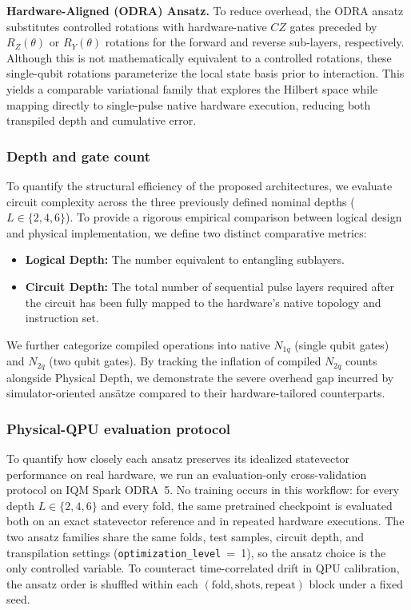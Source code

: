 \documentclass[11pt]{article}
\begin{document}
\textbf{Hardware-Aligned (ODRA) Ansatz.}
To reduce overhead, the ODRA ansatz~\cite{abbas2021} substitutes controlled rotations with hardware-native $CZ$ gates preceded by $R_Z(\theta)$ or $R_Y(\theta)$ rotations for the forward and reverse sub-layers, respectively. Although this is not mathematically equivalent to a controlled rotations, these single-qubit rotations parameterize the local state basis prior to interaction. This yields a comparable variational family that explores the Hilbert space while mapping directly to single-pulse native hardware execution, reducing both transpiled depth and cumulative error.

\subsubsection{Depth and gate count}

To quantify the structural efficiency of the proposed architectures, we evaluate circuit complexity across the three previously defined nominal depths ($L \in \{2, 4, 6\}$). To provide a rigorous empirical comparison between logical design and physical implementation, we define two distinct comparative metrics:
\begin{itemize}
    \item \textbf{Logical Depth:} The number equivalent to entangling sublayers.
    \item \textbf{Circuit Depth:} The total number of sequential pulse layers required after the circuit has been fully mapped to the hardware's native topology and instruction set.
\end{itemize}
We further categorize compiled operations into native $N_{1q}$ (single qubit gates) and $N_{2q}$ (two qubit gates). By tracking the inflation of compiled $N_{2q}$ counts alongside Physical Depth, we demonstrate the severe overhead gap incurred by simulator-oriented ansätze compared to their hardware-tailored counterparts.

\subsubsection{Physical-QPU evaluation protocol}

To quantify how closely each ansatz preserves its idealized statevector performance on real hardware, we run an evaluation-only cross-validation protocol on IQM Spark ODRA~5. No training occurs in this workflow: for every depth $L \in \{2, 4, 6\}$ and every fold, the same pretrained checkpoint is evaluated both on an exact statevector reference and in repeated hardware executions. The two ansatz families share the same folds, test samples, circuit depth, and transpilation settings (\texttt{optimization\_level}~=~1), so the ansatz choice is the only controlled variable. To counteract time-correlated drift in QPU calibration, the ansatz order is shuffled within each $(\text{fold}, \text{shots}, \text{repeat})$ block under a fixed seed.
\end{document}
